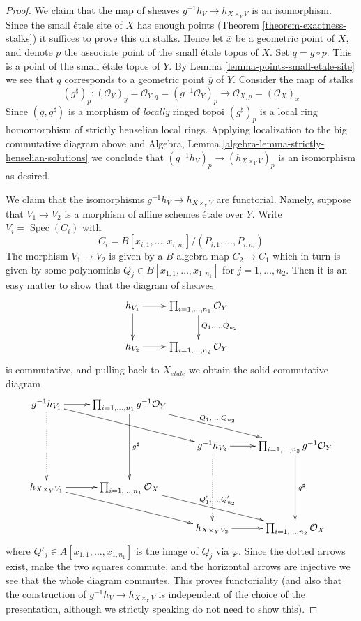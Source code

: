 \documentclass[10pt,a4paper]{amsart}
\theoremstyle{plain}
\theoremstyle{definition}
\theoremstyle{remark}
\numberwithin{equation}{subsection}
\def\Spec{\mathop{\mathrm{Spec}}}
\def\etale{{\acute{e}tale}}
\begin{document}
\begin{proof}
\medskip\noindent
We claim that the map of sheaves $g^{-1}h_V \to h_{X \times_Y V}$
is an isomorphism. Since the small \'etale site of $X$ has enough points
(Theorem \ref{theorem-exactness-stalks})
it suffices to prove this on stalks. Hence let $\overline{x}$ be a
geometric point of $X$, and denote $p$ the associate point of the
small \'etale topos of $X$. Set $q = g \circ p$. This is a point of
the small \'etale topos of $Y$. By
Lemma \ref{lemma-points-small-etale-site}
we see that $q$ corresponds to a geometric point $\overline{y}$ of
$Y$. Consider the map of stalks
$$
(g^\sharp)_p :
(\mathcal{O}_Y)_{\overline{y}} =
\mathcal{O}_{Y, q} =
(g^{-1}\mathcal{O}_Y)_p
\longrightarrow
\mathcal{O}_{X, p} =
(\mathcal{O}_X)_{\overline{x}}
$$
Since $(g, g^\sharp)$ is a morphism of {\it locally} ringed topoi
$(g^\sharp)_p$ is a local ring homomorphism of strictly henselian
local rings. Applying localization to the big commutative diagram above and
Algebra, Lemma \ref{algebra-lemma-strictly-henselian-solutions}
we conclude that $(g^{-1}h_V)_p \to (h_{X \times_Y V})_p$ is an isomorphism
as desired.

\medskip\noindent
We claim that the isomorphisms $g^{-1}h_V \to h_{X \times_Y V}$ are
functorial. Namely, suppose that $V_1 \to V_2$ is a morphism of affine
schemes \'etale over $Y$. Write
$V_i = \Spec(C_i)$ with
$$
C_i = B[x_{i, 1}, \ldots, x_{i, n_i}]/(P_{i, 1}, \ldots, P_{i, n_i})
$$
The morphism $V_1 \to V_2$ is given by a $B$-algebra map $C_2 \to C_1$
which in turn is given by some polynomials
$Q_j \in B[x_{1, 1}, \ldots, x_{1, n_1}]$ for $j = 1, \ldots, n_2$.
Then it is an easy matter to show that the diagram of sheaves
$$
\xymatrix{
h_{V_1} \ar[d] \ar[r] & \prod_{i = 1, \ldots, n_1} \mathcal{O}_Y
\ar[d]^{Q_1, \ldots, Q_{n_2}}\\
h_{V_2} \ar[r] & \prod_{i = 1, \ldots, n_2} \mathcal{O}_Y
}
$$
is commutative, and pulling back to $X_\etale$ we obtain the
solid commutative diagram
$$
\xymatrix{
g^{-1}h_{V_1} \ar@{..>}[dd] \ar[rrd] \ar[r] &
\prod_{i = 1, \ldots, n_1} g^{-1}\mathcal{O}_Y
\ar[dd]^{g^\sharp}
\ar[rrd]^{Q_1, \ldots, Q_{n_2}} \\
& & g^{-1}h_{V_2} \ar@{..>}[dd] \ar[r] &
\prod_{i = 1, \ldots, n_2} g^{-1}\mathcal{O}_Y
\ar[dd]^{g^\sharp} \\
h_{X \times_Y V_1} \ar[r] \ar[rrd] &
\prod\nolimits_{i = 1, \ldots, n_1} \mathcal{O}_X
\ar[rrd]^{Q'_1, \ldots, Q'_{n_2}} \\
& & h_{X \times_Y V_2} \ar[r] &
\prod\nolimits_{i = 1, \ldots, n_2} \mathcal{O}_X
}
$$
where $Q'_j \in A[x_{1, 1}, \ldots, x_{1, n_1}]$ is the image of
$Q_j$ via $\varphi$. Since the dotted arrows exist, make the
two squares commute, and the horizontal arrows are injective
we see that the whole diagram commutes. This proves functoriality
(and also that the construction of $g^{-1}h_V \to h_{X \times_Y V}$
is independent of the choice of the presentation, although we
strictly speaking do not need to show this).


\end{proof}
\end{document}
